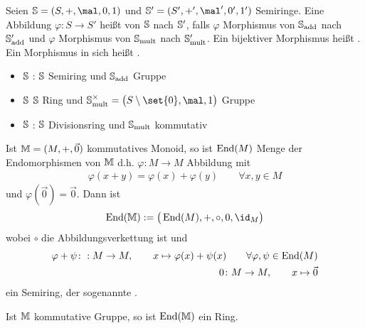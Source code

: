 \begin{definition}
	Seien $\S=(S,+,\mal,0,1)$ und $\S'=(S',+',\mal',0',1')$ Semiringe.
	Eine Abbildung $\varphi\colon S\to S'$ heißt  von $\S$ nach $\S'$, falls $\varphi$ Morphismus von $\S_{\add}$ nach $\S_{\add}'$ und $\varphi$ Morphismus von $\S_{\mult}$ nach $\S_{\mult}'$.\nl
	Ein bijektiver Morphismus heißt .
	Ein Morphismus in sich heißt .


\begin{itemize}
	\item $\S$ : $\S$ Semiring und $\S_{\add}$ Gruppe
	\item $\S$  $\S$ Ring und $\S_{\mult}^\times=\big(S\setminus\set{0},\mal,1\big)$ Gruppe
	\item $\S$ : $\S$ Divisionsring und $\S_{\mult}$ kommutativ
\end{itemize}

\end{definition}

Ist $\M=(M,+,\vec{0})$ kommutatives Monoid, so ist $\End(M)$ Menge der Endomorphismen von $\M$ d.h. $\varphi\colon M\to M$ Abbildung mit
\begin{align*}
	\varphi(x+y)=\varphi(x)+\varphi(y)\qquad\forall x,y\in M
\end{align*}
und $\varphi(\vec{0})=\vec{0}$.
Dann ist 
\begin{align*}
	\End(\M):=\big(\End(M),+,\circ,0,\id_M\big)
\end{align*}
wobei $\circ$ die Abbildungsverkettung ist und
	\begin{align*}
		\varphi+\psi\colon:M\to M,\qquad x\mapsto \varphi(x)+\psi(x)\qquad\forall \varphi,\psi\in\End(M)\\
		0\colon M\to M,\qquad x\mapsto\vec{0}
	\end{align*}
	ein Semiring, der sogenannte .
	
\begin{lemma}
	Ist $\M$ kommutative Gruppe, so ist $\End(\M)$ ein Ring.
\end{lemma}

